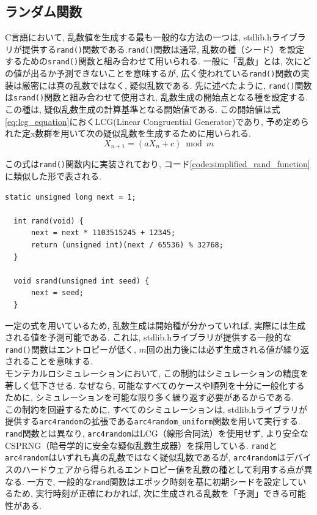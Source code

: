 \documentclass[a4j, 12pt ]{jarticle}
\begin{document}
\subsection{ランダム関数}
C言語において, 乱数値を生成する最も一般的な方法の一つは, stdlib.hライブラリが提供する\texttt{rand()}関数である.\texttt{rand()}関数は通常, 乱数の種（シード）を設定するための\texttt{srand()}関数と組み合わせて用いられる. 一般に「乱数」とは, 次にどの値が出るか予測できないことを意味するが, 広く使われている\texttt{rand()}関数の実装は厳密には真の乱数ではなく, 疑似乱数である. 先に述べたように, \texttt{rand()}関数は\texttt{srand()}関数と組み合わせて使用され, 乱数生成の開始点となる種を設定する. この種は, 疑似乱数生成の計算基準となる開始値である. この開始値は式\ref{eq:lcg_equation}におくLCG(Linear Congruential Generator)であり, 予め定められた定x数群を用いて次の疑似乱数を生成するために用いられる.\\

\begin{equation}\label{eq:lcg_equation}
X_{n+1} = (a X_n + c) \bmod m
\end{equation}

この式は\texttt{rand()}関数内に実装されており, コード\ref{code:simplified_rand_function}に類似した形で表される.\\

\begin{lstlisting}[caption={$rand()$関数の簡単版}, label={code:simplified_rand_function}]
  static unsigned long next = 1;

  int rand(void) {
      next = next * 1103515245 + 12345;
      return (unsigned int)(next / 65536) % 32768;
  }

  void srand(unsigned int seed) {
      next = seed;
  }
\end{lstlisting}

一定の式を用いているため, 乱数生成は開始種が分かっていれば, 実際には生成される値を予測可能である. これは, stdlib.hライブラリが提供する一般的な\texttt{rand()}関数はエントロピーが低く, $m$回の出力後には必ず生成される値が繰り返されることを意味する.\cite{wolfgang1992random}\\

モンテカルロシミュレーションにおいて, この制約はシミュレーションの精度を著しく低下させる. なぜなら, 可能なすべてのケースや順列を十分に一般化するために, シミュレーションを可能な限り多く繰り返す必要があるからである.\cite{Ossola_2004}\\

この制約を回避するために, すべてのシミュレーションは, stdlib.hライブラリが提供する\texttt{arc4random}の拡張である\texttt{arc4random\_uniform}関数を用いて実行する. \texttt{rand}関数とは異なり, \texttt{arc4random}はLCG（線形合同法）を使用せず, より安全なCSPRNG（暗号学的に安全な疑似乱数生成器）を採用している. \texttt{rand}と\texttt{arc4random}はいずれも真の乱数ではなく疑似乱数であるが, \texttt{arc4random}はデバイスのハードウェアから得られるエントロピー値を乱数の種として利用する点が異なる. 一方で, 一般的な\texttt{rand}関数はエポック時刻を基に初期シードを設定しているため, 実行時刻が正確にわかれば, 次に生成される乱数を「予測」できる可能性がある.\cite{openbsd_arc4random}\\
\end{document}
